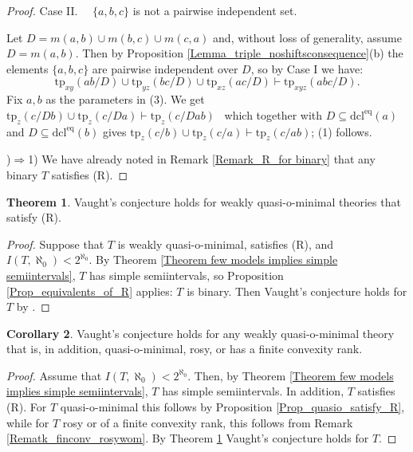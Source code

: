 \documentclass{amsart}
\theoremstyle{definition}
\newtheorem{Theorem}{Theorem}[section]
\newtheorem{Corollary}[Theorem]{Corollary}
\theoremstyle{definition}
\newcommand{\tp}{\mathrm{tp}}
\newcommand{\dcleq}{\mathrm{dcl^{eq}}}
\begin{document}
\begin{proof}
\smallskip 
 Case II. \ \ $\{a,b,c\}$ is not a pairwise independent set.

Let $D= m(a,b)\cup m(b,c)\cup m(c,a)$ and, without loss of generality, assume $D= m(a,b)$. 
Then by Proposition \ref{Lemma_triple_noshiftsconsequence}(b)   the elements $\{a,b,c\}$ are pairwise independent over $D$, so by Case I we have:
\begin{equation}
\tp_{xy}(ab/D)\cup \tp_{yz}(bc/D)\cup \tp_{xz}(ac/D)\vdash \tp_{xyz}(abc/D).
 \end{equation}
Fix $a,b$ as the parameters in (3). We get \ $\tp_z(c/Db)\cup \tp_z(c/Da) \vdash \tp_z(c/Dab)$   \ which together with
 $D\subseteq \dcleq(a)$ and $D\subseteq  \dcleq(b)$ gives $\tp_z(c/b)\cup \tp_z(c/a) \vdash \tp_z(c/ab)$; (1) follows.  

 )$\Rightarrow$1) We have already noted in Remark \ref{Remark_R_for binary} that any binary $T$ satisfies (R).
\end{proof}

\begin{Theorem}\label{Theorem_VC for R}
Vaught's conjecture holds for weakly quasi-o-minimal theories that satisfy (R).
\end{Theorem}
\begin{proof}
Suppose that $T$ is weakly quasi-o-minimal, satisfies (R), and  $I(T,\aleph_0)<2^{\aleph_0}$. By Theorem \ref{Theorem few models implies simple semiintervals}, $T$ has simple semiintervals, so Proposition \ref{Prop_equivalents_of_R} applies: $T$ is binary. Then Vaught's conjecture holds for $T$ by \cite[Theorem 1]{MT}.
\end{proof}

 

\setcounter{equation}{0}


\begin{Corollary}\label{Cor_few_ros_ finconvquasi bin_are_binary}
Vaught's conjecture holds for any weakly quasi-o-minimal theory that is, in addition, quasi-o-minimal, rosy, or has a finite convexity rank. 
\end{Corollary}
\begin{proof} Assume that  $I(T,\aleph_0)<2^{\aleph_0}$. 
Then, by Theorem \ref{Theorem few models implies simple semiintervals}, $T$ has simple semiintervals. In addition, $T$ satisfies (R). For $T$ quasi-o-minimal this follows by Proposition \ref{Prop_quasio_satisfy_R}, while for $T$ rosy or of a finite convexity rank, this follows from Remark \ref{Rematk_finconv_rosywom}. By Theorem \ref{Theorem_VC for R} Vaught's conjecture holds for $T$.
\end{proof}
\end{document}
